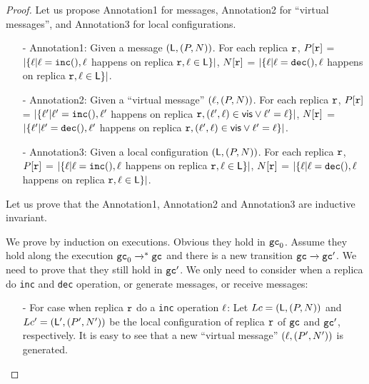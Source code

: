 \begin {proof}

Let us propose Annotation1 for messages, Annotation2 for ``virtual messages'', and Annotation3 for local configurations.

\begin{itemize}
\setlength{\itemsep}{0.5pt}
\item[-] Annotation1: Given a message $(\alabelset,(P,N))$. For each replica $\arep$, $P[\arep]$ =  $\vert \{ \alabel \vert \alabel = \alabelshort[{\tt inc}]{}, \alabel$ happens on replica $\arep, \alabel \in \alabelset \} \vert$, $N[\arep]$ =  $\vert \{ \alabel \vert \alabel = \alabelshort[{\tt dec}]{}, \alabel$ happens on replica $\arep, \alabel \in \alabelset \} \vert$.

\item[-] Annotation2: Given a ``virtual message'' $(\alabel,(P,N))$. For each replica $\arep$, $P[\arep]$ =  $\vert \{ \alabel' \vert \alabel' = \alabelshort[{\tt inc}]{}, \alabel'$ happens on replica $\arep, (\alabel',\alabel) \in \avisord \vee \alabel' = \alabel \} \vert$, $N[\arep]$ =  $\vert \{ \alabel' \vert \alabel' = \alabelshort[{\tt dec}]{}, \alabel'$ happens on replica $\arep, (\alabel',\alabel) \in \avisord \vee \alabel' = \alabel \} \vert$.

\item[-] Annotation3: Given a local configuration $(\alabelset,(P,N))$. For each replica $\arep$, $P[\arep]$ =  $\vert \{ \alabel \vert \alabel = \alabelshort[{\tt inc}]{}, \alabel$ happens on replica $\arep, \alabel \in \alabelset \} \vert$, $N[\arep]$ =  $\vert \{ \alabel \vert \alabel = \alabelshort[{\tt dec}]{}, \alabel$ happens on replica $\arep, \alabel \in \alabelset \} \vert$.
\end{itemize}


Let us prove that the Annotation1, Annotation2 and Annotation3 are inductive invariant.

We prove by induction on executions. Obvious they hold in $\aglobalstate_0$. Assume they hold along the execution $\aglobalstate_0 \xrightarrow{}^* \aglobalstate$ and there is a new transition $\aglobalstate \xrightarrow{} \aglobalstate'$. We need to prove that they still hold in $\aglobalstate'$. We only need to consider when a replica do {\tt inc} and {\tt dec} operation, or generate messages, or receive messages:

\begin{itemize}
\setlength{\itemsep}{0.5pt}
\item[-] For case when replica $\arep$ do a {\tt inc} operation $\alabel$: Let $Lc = (\alabelset,(P,N))$ and $Lc' = (\alabelset',(P',N'))$ be the local configuration of replica $\arep$ of $\aglobalstate$ and $\aglobalstate'$, respectively. It is easy to see that a new ``virtual message'' $(\alabel,(P',N'))$ is generated.


\end{itemize}
\end{proof}
